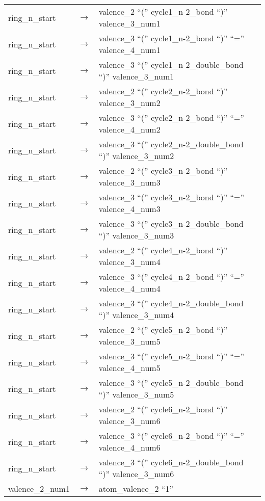 \documentclass[../Document.tex]{subfiles}
\begin{document}
\begin{longtable}{m{} p{} p{}}
    ring\_n\_start & $\rightarrow$ & valence\_2 ``('' cycle1\_n-2\_bond ``)'' valence\_3\_num1 \\
    ring\_n\_start & $\rightarrow$ & valence\_3 ``('' cycle1\_n-2\_bond ``)'' ``='' valence\_4\_num1 \\
    ring\_n\_start & $\rightarrow$ & valence\_3 ``('' cycle1\_n-2\_double\_bond ``)'' valence\_3\_num1 \\
    ring\_n\_start & $\rightarrow$ & valence\_2 ``('' cycle2\_n-2\_bond ``)'' valence\_3\_num2 \\
    ring\_n\_start & $\rightarrow$ & valence\_3 ``('' cycle2\_n-2\_bond ``)'' ``='' valence\_4\_num2 \\
    ring\_n\_start & $\rightarrow$ & valence\_3 ``('' cycle2\_n-2\_double\_bond ``)'' valence\_3\_num2 \\
    ring\_n\_start & $\rightarrow$ & valence\_2 ``('' cycle3\_n-2\_bond ``)'' valence\_3\_num3 \\
    ring\_n\_start & $\rightarrow$ & valence\_3 ``('' cycle3\_n-2\_bond ``)'' ``='' valence\_4\_num3 \\
    ring\_n\_start & $\rightarrow$ & valence\_3 ``('' cycle3\_n-2\_double\_bond ``)'' valence\_3\_num3 \\
    ring\_n\_start & $\rightarrow$ & valence\_2 ``('' cycle4\_n-2\_bond ``)'' valence\_3\_num4 \\
    ring\_n\_start & $\rightarrow$ & valence\_3 ``('' cycle4\_n-2\_bond ``)'' ``='' valence\_4\_num4 \\
    ring\_n\_start & $\rightarrow$ & valence\_3 ``('' cycle4\_n-2\_double\_bond ``)'' valence\_3\_num4 \\
    ring\_n\_start & $\rightarrow$ & valence\_2 ``('' cycle5\_n-2\_bond ``)'' valence\_3\_num5 \\
    ring\_n\_start & $\rightarrow$ & valence\_3 ``('' cycle5\_n-2\_bond ``)'' ``='' valence\_4\_num5 \\
    ring\_n\_start & $\rightarrow$ & valence\_3 ``('' cycle5\_n-2\_double\_bond ``)'' valence\_3\_num5 \\
    ring\_n\_start & $\rightarrow$ & valence\_2 ``('' cycle6\_n-2\_bond ``)'' valence\_3\_num6 \\
    ring\_n\_start & $\rightarrow$ & valence\_3 ``('' cycle6\_n-2\_bond ``)'' ``='' valence\_4\_num6 \\
    ring\_n\_start & $\rightarrow$ & valence\_3 ``('' cycle6\_n-2\_double\_bond ``)'' valence\_3\_num6 \\
    valence\_2\_num1 & $\rightarrow$ & atom\_valence\_2 ``1'' \\

\end{longtable}
\end{document}
